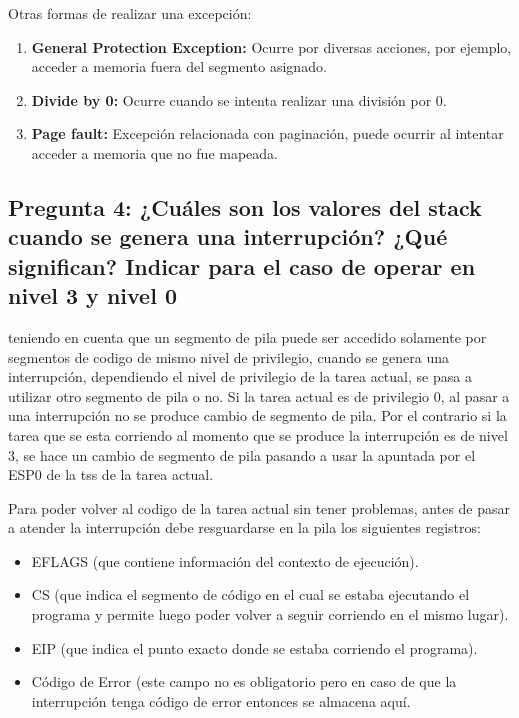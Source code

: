 \documentclass[a4paper,10pt,twoside]{article}
\begin{document}
Otras formas de realizar una excepción:
\begin{enumerate}
	\item \textbf{General Protection Exception:}
	Ocurre por diversas acciones, por ejemplo, acceder a memoria fuera del segmento asignado.
	\item \textbf{Divide by 0:}
	Ocurre cuando se intenta realizar una división por 0.
	\item \textbf{Page fault:}
	Excepción relacionada con paginación, puede ocurrir al intentar acceder a memoria que no fue mapeada.
\end{enumerate}


\subsection{Pregunta 4: ¿Cuáles son los valores del stack cuando se genera una interrupción? ¿Qué significan? Indicar para el caso de operar en nivel 3 y nivel 0}

teniendo en cuenta que un segmento de pila puede ser accedido solamente por segmentos de codigo de mismo nivel de privilegio, cuando se genera una interrupción, dependiendo el nivel de privilegio de la tarea actual, se pasa a utilizar otro segmento de pila o no. Si la tarea actual es de privilegio 0, al pasar a una interrupción no se produce cambio de segmento de pila. Por el contrario si la tarea que se esta corriendo al momento que se produce la interrupción es de nivel 3, se hace un cambio de segmento de pila pasando a usar la apuntada por el ESP0 de la tss de la tarea actual.

Para poder volver al codigo de la tarea actual sin tener problemas, antes de pasar a atender la interrupción debe resguardarse en la pila los siguientes registros:

\begin{itemize}
 \item EFLAGS (que contiene información del contexto de ejecución).
 \item CS (que indica el segmento de código en el cual se estaba ejecutando el programa y permite luego poder volver a seguir corriendo en el mismo lugar).
 \item EIP (que indica el punto exacto donde se estaba corriendo el programa).
 \item Código de Error (este campo no es obligatorio pero en caso de que la interrupción tenga código de error entonces se almacena aquí.
\end{itemize}
\end{document}
